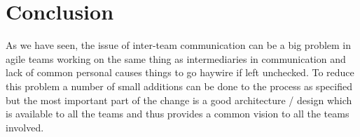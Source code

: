 \section{Conclusion} 
\label{sec:conclusion}
As we have seen, the issue of inter-team communication can be a big problem in agile teams working on the same thing as intermediaries in communication and lack of common personal causes things to go haywire if left unchecked.
To reduce this problem a number of small additions can be done to the process as specified but the most important part of the change is a good architecture / design which is available to all the teams and thus provides a common vision to all the teams involved.